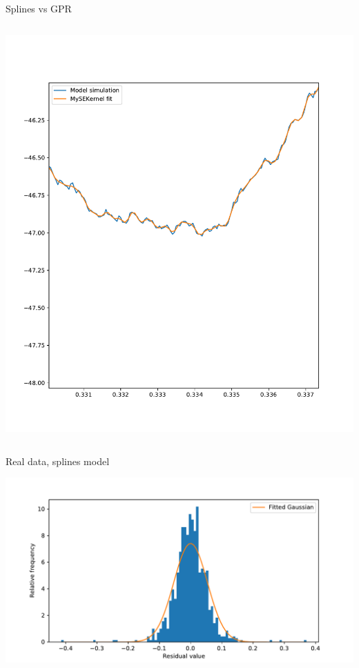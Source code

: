 \documentclass[presentation]{beamer}
\begin{document}
\begin{frame}[plain,label={sec:org8dbeab2}]{Splines vs GPR}
\begin{columns}
\begin{column}{0.5\columnwidth}
\begin{center}
\includegraphics[width=1.1\textwidth]{./SEKernel2.pdf}
\end{center}
\end{column}
\end{columns}
\end{frame}


\begin{frame}[label={sec:org4b5a1fa}]{Real data, splines model}
\begin{center}
\includegraphics[width=.9\textwidth]{./hist.pdf}
\end{center}
\vfill
\end{frame}
\end{document}
